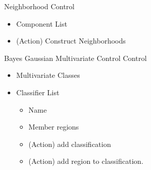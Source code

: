 \documentclass[11pt, twocolumn]{article}
\begin{document}
Neighborhood Control
\begin{itemize}
	\item Component List
	\item (Action) Construct Neighborhoods
\end{itemize}

Bayes Gaussian Multivariate Control Control
\begin{itemize}
	\item Multivariate Classes
	\item Classifier List
	\begin{itemize}
		\item Name
		\item Member regions
		\item (Action) add classification
		\item (Action) add region to classification.
	\end{itemize}
	
\end{itemize}




\end{document}
